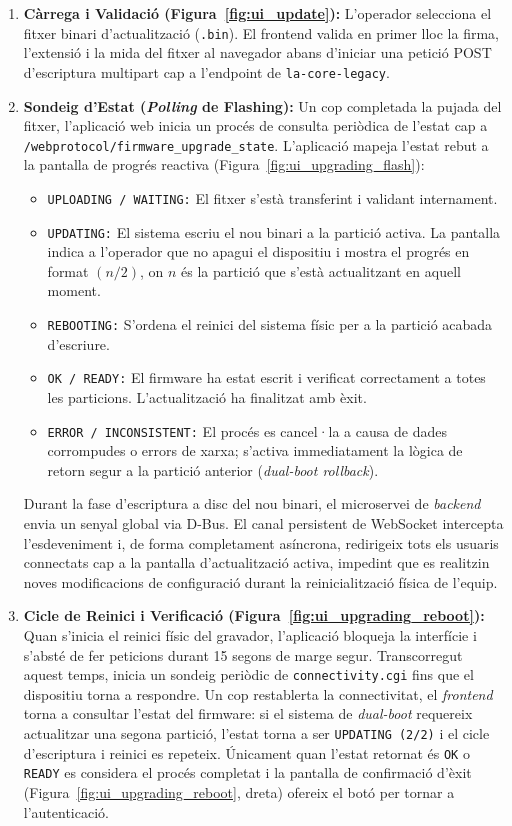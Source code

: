\begin{enumerate}
  \item \textbf{Càrrega i Validació (Figura~\ref{fig:ui_update}):} L'operador selecciona el fitxer binari d'actualització (\texttt{.bin}). El frontend valida en primer lloc la firma, l'extensió i la mida del fitxer al navegador abans d'iniciar una petició POST d'escriptura multipart cap a l'endpoint de \texttt{la-core-legacy}.
  \item \textbf{Sondeig d'Estat (\textit{Polling} de Flashing):} Un cop completada la pujada del fitxer, l'aplicació web inicia un procés de consulta periòdica de l'estat cap a \texttt{/webprotocol/firmware\_upgrade\_state}. L'aplicació mapeja l'estat rebut a la pantalla de progrés reactiva (Figura~\ref{fig:ui_upgrading_flash}):
        \begin{itemize}
          \item \texttt{UPLOADING / WAITING:} El fitxer s'està transferint i validant internament.
          \item \texttt{UPDATING:} El sistema escriu el nou binari a la partició activa. La pantalla indica a l'operador que no apagui el dispositiu i mostra el progrés en format $(n/2)$, on $n$ és la partició que s'està actualitzant en aquell moment.
          \item \texttt{REBOOTING:} S'ordena el reinici del sistema físic per a la partició acabada d'escriure.
          \item \texttt{OK / READY:} El firmware ha estat escrit i verificat correctament a totes les particions. L'actualització ha finalitzat amb èxit.
          \item {\sloppy\texttt{ERROR /\allowbreak{} INCONSISTENT:} El procés es cancel·la a causa de dades corrompudes o errors de xarxa; s'activa immediatament la lògica de retorn segur a la partició anterior (\textit{dual-boot rollback}).\par}
        \end{itemize}
        Durant la fase d'escriptura a disc del nou binari, el microservei de \textit{backend} envia un senyal global via D-Bus. El canal persistent de WebSocket intercepta l'esdeveniment i, de forma completament asíncrona, redirigeix tots els usuaris connectats cap a la pantalla d'actualització activa, impedint que es realitzin noves modificacions de configuració durant la reinicialització física de l'equip.
  \item \textbf{Cicle de Reinici i Verificació (Figura~\ref{fig:ui_upgrading_reboot}):} Quan s'inicia el reinici físic del gravador, l'aplicació bloqueja la interfície i s'absté de fer peticions durant 15 segons de marge segur. Transcorregut aquest temps, inicia un sondeig periòdic de \texttt{connectivity.cgi} fins que el dispositiu torna a respondre. Un cop restablerta la connectivitat, el \textit{frontend} torna a consultar l'estat del firmware: si el sistema de \textit{dual-boot} requereix actualitzar una segona partició, l'estat torna a ser \texttt{UPDATING (2/2)} i el cicle d'escriptura i reinici es repeteix. Únicament quan l'estat retornat és \texttt{OK} o \texttt{READY} es considera el procés completat i la pantalla de confirmació d'èxit (Figura~\ref{fig:ui_upgrading_reboot}, dreta) ofereix el botó per tornar a l'autenticació.

\end{enumerate}
